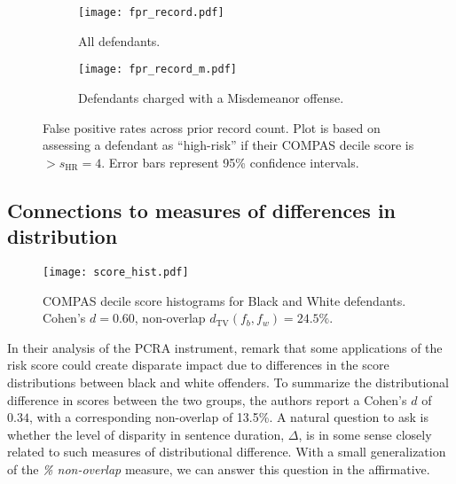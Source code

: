 \documentclass[11pt, svgnames]{article}
\numberwithin{equation}{section}
\theoremstyle{plain}
\theoremstyle{definition}
\numberwithin{prop}{section}
\numberwithin{corollary}{section}
\begin{document}
  

\begin{figure}[!ht]
 \centering
 \begin{subfigure}[t]{0.48\linewidth}
   \texttt{[image: fpr\_record.pdf]}
   \caption{All defendants.}
 \end{subfigure}
 \hspace{1em}
 \begin{subfigure}[t]{0.48\linewidth}
   \texttt{[image: fpr\_record\_m.pdf]}
   \caption{Defendants charged with a Misdemeanor offense. }
 \end{subfigure}
 
 \vspace{1em}
 \caption{False positive rates across prior record count.  Plot is based on assessing a defendant as ``high-risk'' if their COMPAS decile score is $> s_\mathrm{HR} = 4$. Error bars represent 95\% confidence intervals.}
 \label{fig:fpr_prior}
\end{figure}

\subsection{Connections to measures of differences in distribution}

 \begin{figure}[t]
    \centering
    \texttt{[image: score\_hist.pdf]}
    \caption{\small COMPAS decile score histograms for Black and White defendants.  Cohen's $d = 0.60$, non-overlap $d_{\mathrm{TV}}(f_b, f_w) = 24.5\%$.}
    \label{fig:score_plot}
 \end{figure}

  In their analysis of the PCRA instrument, \citet{skeem2015risk} remark that some applications of the risk score could create disparate impact due to differences in the  score distributions between black and white offenders.  To summarize the distributional difference in scores between the two groups, the authors report a Cohen's $d$ of $0.34$, with a corresponding non-overlap of 13.5\%.  A natural question to ask is whether the level of disparity in sentence duration, $\Delta$, is in some sense closely related to such measures of distributional difference.  With a small generalization of the \emph{\% non-overlap} measure, we can answer this question in the affirmative.  
  
\end{document}

